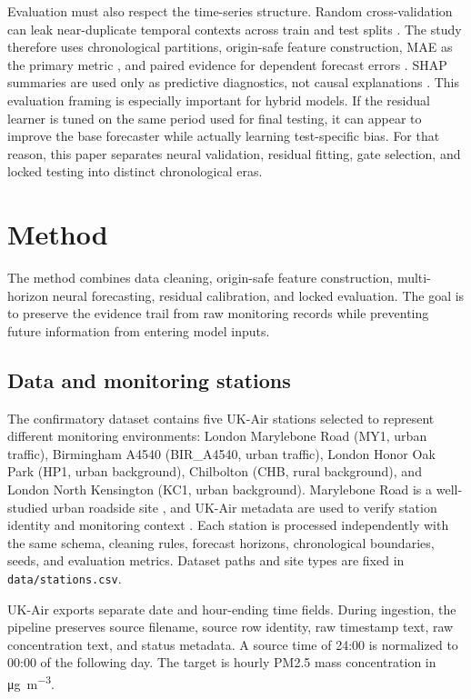 \documentclass[sn-mathphys-num]{sn-jnl}
\begin{document}
Evaluation must also respect the time-series structure. Random cross-validation
can leak near-duplicate temporal contexts across train and test splits
\cite{bergmeir2018cv}. The study therefore uses chronological partitions,
origin-safe feature construction, MAE as the primary metric
\cite{willmott2005mae}, and paired evidence for dependent forecast errors
\cite{diebold1995accuracy,newey1987hac}. SHAP summaries are used only as
predictive diagnostics, not causal explanations \cite{lundberg2017shap}.
This evaluation framing is especially important for hybrid models. If the
residual learner is tuned on the same period used for final testing, it can
appear to improve the base forecaster while actually learning test-specific
bias. For that reason, this paper separates neural validation, residual
fitting, gate selection, and locked testing into distinct chronological eras.

\section{Method}
\label{sec:method}

The method combines data cleaning, origin-safe feature construction,
multi-horizon neural forecasting, residual calibration, and locked evaluation.
The goal is to preserve the evidence trail from raw monitoring records while
preventing future information from entering model inputs.

\subsection{Data and monitoring stations}
\label{sec:site}

The confirmatory dataset contains five UK-Air stations selected to represent
different monitoring environments: London Marylebone Road (MY1, urban
traffic), Birmingham A4540 (BIR\_A4540, urban traffic), London Honor Oak Park
(HP1, urban background), Chilbolton (CHB, rural background), and London North
Kensington (KC1, urban background). Marylebone Road is a well-studied urban
roadside site \cite{kamara2021marylebone}, and UK-Air metadata are used to
verify station identity and monitoring context
\cite{ukair2026my1,ukair2026kc1,ukair2026hp1}. Each station is processed
independently with the same schema, cleaning rules, forecast horizons,
chronological boundaries, seeds, and evaluation metrics. Dataset paths and
site types are fixed in \texttt{data/stations.csv}.

UK-Air exports separate date and hour-ending time fields. During ingestion,
the pipeline preserves source filename, source row identity, raw timestamp
text, raw concentration text, and status metadata. A source time of 24:00 is
normalized to 00:00 of the following day. The target is hourly PM2.5 mass
concentration in \si{\micro\gram\per\cubic\meter}.
\end{document}
